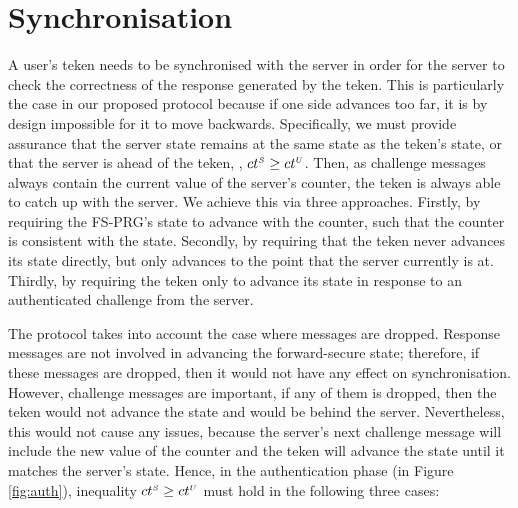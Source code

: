 


\section{Synchronisation}
\label{app:synchronisation}

A user's teken needs to be synchronised with the server
in order for the server to check the correctness of the response generated by the teken.
This is particularly the case in our proposed protocol because
if one side advances too far, it is by design impossible for it to
move backwards. Specifically, we must provide assurance that the server state remains at the same state as the teken's state, or that the server is ahead of the teken, \ie, ${ct}^{\scriptscriptstyle S} \geq {ct}^{\scriptscriptstyle U}$. Then, as challenge messages always contain the current value of the server's counter, the teken is always able to catch up with the server. We achieve this via three approaches.  Firstly, by requiring the FS-PRG's state to advance with the counter, such that the counter is consistent with the state. Secondly, by requiring that the teken never advances its state directly, but only advances to the point that the server currently is at. Thirdly, by requiring the teken only to advance its state in response to an authenticated challenge from the server.%


The protocol takes into account the case where messages are dropped.
Response messages are not involved in advancing the forward-secure state; therefore, if these messages are dropped, then it would not have any effect on synchronisation. However, challenge messages are important, if any of them is dropped, then the teken would not advance the state and would be behind the server. Nevertheless, this would not cause any issues, because the server's next challenge message will include the new value of the counter and the teken will advance the state until it matches the server's state. Hence, in the authentication phase (in Figure \ref{fig:auth}), inequality ${ct}^{\scriptscriptstyle S} \geq {ct}^{\scriptscriptstyle U}$ must hold in the following three cases:  


